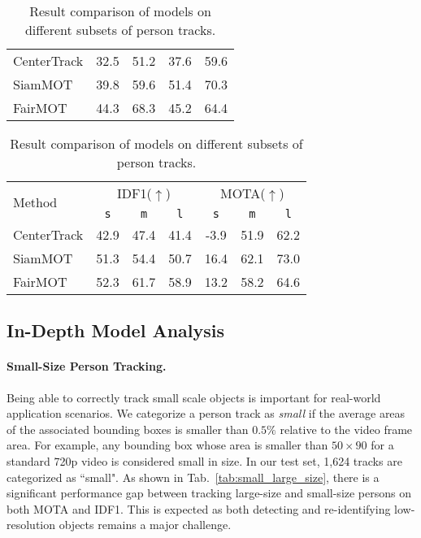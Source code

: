\documentclass[runningheads]{llncs}
\begin{document}
\begin{table}[t]
\begin{minipage}[t]{0.45\textwidth}
\begin{tabular}{lcccc}
        CenterTrack  & 32.5  & 51.2  & 37.6  & 59.6 \\
        SiamMOT  & 39.8  & 59.6  & 51.4  & 70.3 \\
        FairMOT  & 44.3  & 68.3  & 45.2  & 64.4 \\
        \bottomrule
    \end{tabular}
\label{tab:long_occluded}
\end{minipage}
\hfill
\begin{minipage}[t]{0.5\textwidth}
    \small
    \centering
    \begin{tabular}{lcccccc}
        \toprule
        \multirow{2}{*}{Method}  & \multicolumn{3}{c}{IDF1($\uparrow$)} & \multicolumn{3}{c}{MOTA($\uparrow$)}  \\
                 & \texttt{s} & \texttt{m} & \texttt{l} & \texttt{s} & \texttt{m} & \texttt{l} \\
        \midrule


        CenterTrack  & 42.9  & 47.4  & 41.4  & -3.9  & 51.9  & 62.2 \\
        SiamMOT  & 51.3  & 54.4  & 50.7  & 16.4  & 62.1  & 73.0 \\
        FairMOT  & 52.3  & 61.7  & 58.9  & 13.2  & 58.2  & 64.6 \\
        \bottomrule
    \end{tabular}
    \label{tab:track_duration}
\end{minipage}
\caption{\small Result comparison of models on different subsets of person tracks.}
\end{table}
\subsection{In-Depth Model Analysis}
\paragraph{\textbf{Small-Size Person Tracking.}}
Being able to correctly track small scale objects is important for real-world application scenarios. We categorize a person track as \textit{small} if the average areas of the associated bounding boxes is smaller than $0.5\%$ relative to the video frame area. 
For example, any bounding box whose area is smaller than $50 \times 90$ for a standard 720p video is considered small in size. In our test set, 1,624 tracks are categorized as ``small".
As shown in Tab.~\ref{tab:small_large_size}, there is a significant performance gap between tracking large-size and small-size persons on both MOTA and IDF1. This is expected as both detecting and re-identifying low-resolution objects remains a major challenge. 
\end{document}
